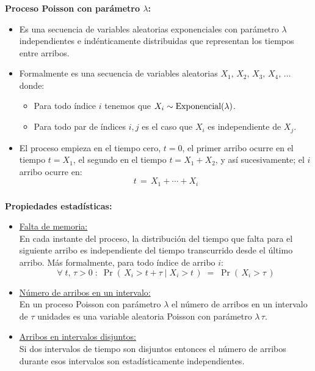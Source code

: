 \documentclass[ 10pt, xcolor = dvipsnames]{beamer}
\begin{document}
\begin{frame}[allowframebreaks]
\frametitle{\insertsection}

\textbf{Proceso Poisson con par\'ametro $\lambda$:}
\begin{itemize}
\item Es una secuencia de variables aleatorias exponenciales con par\'ametro $\lambda$ independientes e ind\'enticamente distribuidas que representan los tiempos entre arribos. 
\item Formalmente es una secuencia de variables aleatorias $X_1, \, X_2, \, X_3, \, X_4, \, \dots$ donde: 
\begin{itemize}
\item Para todo \'indice $i$ tenemos que $X_i \sim \text{Exponencial}(\lambda)$. 
\item Para todo par de \'indices $i,j$ es el caso que $X_i$ es independiente de $X_j$. 
\end{itemize}
\item El proceso empieza en el tiempo cero, \ie $t = 0$, el primer arribo ocurre en \linebreak el tiempo $t = X_1$, el segundo en el tiempo $t = X_1 + X_2$, y as\'i sucesivamente; \ie el $i$ arribo ocurre en: 
\[
t \, = \, X_1 + \cdots + X_i
\]
\end{itemize}

\end{frame}

\begin{frame}[allowframebreaks]
\frametitle{\insertsection}

\textbf{Propiedades estad\'isticas:}
\begin{itemize}
\item \underline{Falta de memoria:} \\ En cada instante del proceso, la distribuci\'on del tiempo que falta para el siguiente arribo es independiente del tiempo transcurrido desde el \linebreak \'ultimo arribo. M\'as formalmente, para todo \'indice de arribo $i$: 
\[
\forall \; t, \, \tau > 0 \; \colon \;
\Pr( \, X_i > t + \tau \mid X_i > t \, ) \; = \;
\Pr( \, X_i > \tau \, )
\]
\item \underline{N\'umero de arribos en un intervalo:} \\ En un proceso Poisson con par\'ametro $\lambda$ el n\'umero de arribos en un intervalo de $\tau$ unidades es una variable aleatoria Poisson con par\'ametro $\lambda \, \tau$. 
\item \underline{Arribos en intervalos disjuntos:} \\ Si dos intervalos de tiempo son disjuntos entonces el n\'umero de arribos durante esos intervalos son estad\'isticamente independientes. 
\end{itemize}

\end{frame}
\end{document}
